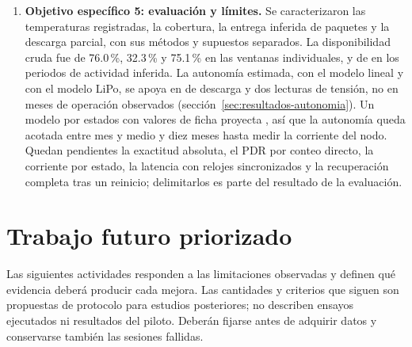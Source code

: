 \begin{enumerate}
\item \textbf{Objetivo específico 5: evaluación y límites.} Se caracterizaron las temperaturas registradas, la cobertura, la entrega inferida de paquetes y la descarga parcial, con sus métodos y supuestos separados. La disponibilidad cruda fue de 76.0\,\%, 32.3\,\% y 75.1\,\% en las ventanas individuales, y de \DisponibilidadEnlace{} en los periodos de actividad inferida. La autonomía estimada, \AutonomiaLinealEstimada{} con el modelo lineal y \AutonomiaModeloEstimada{} con el modelo LiPo, se apoya en \DuracionDescarga{} de descarga y dos lecturas de tensión, no en meses de operación observados (sección~\ref{sec:resultados-autonomia}). Un modelo por estados con valores de ficha proyecta \AutonomiaFichaRango{}, así que la autonomía queda acotada entre mes y medio y diez meses hasta medir la corriente del nodo. Quedan pendientes la exactitud absoluta, el PDR por conteo directo, la corriente por estado, la latencia con relojes sincronizados y la recuperación completa tras un reinicio; delimitarlos es parte del resultado de la evaluación.
\end{enumerate}

\section{Trabajo futuro priorizado}
\label{sec:conclusiones-futuro}
Las siguientes actividades responden a las limitaciones observadas y definen qué evidencia deberá producir cada mejora. Las cantidades y criterios que siguen son propuestas de protocolo para estudios posteriores; no describen ensayos ejecutados ni resultados del piloto. Deberán fijarse antes de adquirir datos y conservarse también las sesiones fallidas.

